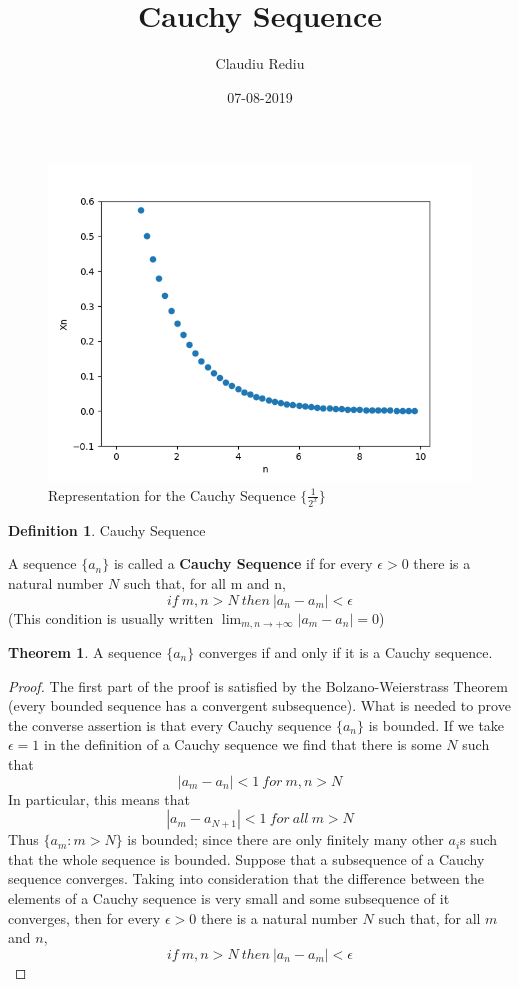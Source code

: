 \documentclass[12pt]{problemClass}
\title{{\myfont Cauchy Sequence}}
\date{07-08-2019}
\author{Claudiu Rediu}
\theoremstyle{definition}
\newtheorem*{definition}{Definition} %
\theoremstyle{theorem}
\newtheorem{theorem}{Theorem}
\begin{document}
	\maketitle
	\newpage
	\newpage
	\begin{figure}[h]
		\includegraphics[width = \linewidth]{graph.png}
		\caption{Representation for the Cauchy Sequence $\{\frac{1}{2^x}\}$ }
	\end{figure}
	\begin{definition}{Cauchy Sequence}
		
		A sequence $\{a_n\}$ is called a \textbf{Cauchy Sequence} if for every $\epsilon > 0 $ there is a natural number $N$ such that, for all m and n, 
		$$ if \ m, n > N \ then \ |a_n - a_m| < \epsilon $$
		(This condition is usually written $\lim_{m,n \to +\infty} |a_m - a_n| = 0 $)
	\end{definition}
	
	\begin{theorem}
		A sequence $\{a_n\}$ converges if and only if it is a Cauchy sequence.
	\end{theorem}

	\begin{proof}
		The first part of the proof is satisfied by the Bolzano-Weierstrass Theorem (every bounded sequence has a convergent subsequence). What is needed to prove the converse assertion is that every Cauchy sequence $\{a_n\}$ is bounded.
		If we take $\epsilon = 1$ in the definition of a Cauchy sequence we find that there is some $N$ such that
		$$|a_m - a_n| < 1 \ for \ m,n > N $$
		In particular, this means that
		$$ |a_m - a_{N+1}| < 1 \ for \  all \ m > N$$
		Thus $\{a_m : m > N\}$ is bounded; since there are only finitely many other $a_i$s such that the whole sequence is bounded.
		Suppose that a subsequence of a Cauchy sequence converges. Taking into consideration that the difference between the elements of a Cauchy sequence is very small and some subsequence of it converges, then for every $\epsilon > 0$ there is a natural number $N$ such that, for all $m$ and $n$,
		$$ if \ m, n > N \ then \ |a_n - a_m| < \epsilon $$
	\end{proof}

	
\end{document}
